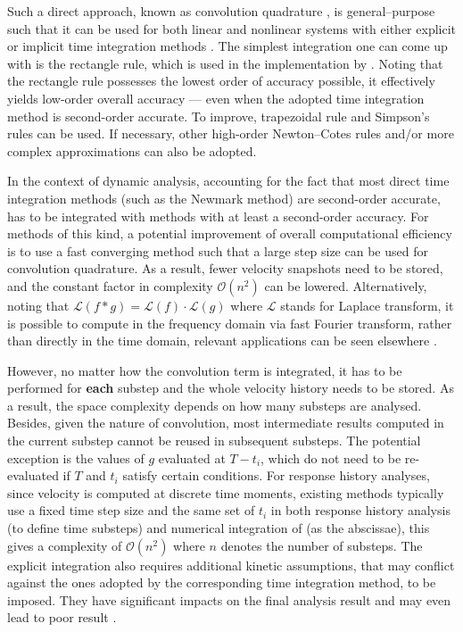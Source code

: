 Such a direct approach, known as convolution quadrature \citep[see][and the references therein]{Lubich2004}, is general--purpose such that it can be used for both linear and nonlinear systems with either explicit or implicit time integration methods \citep[see, e.g.,][]{Katsikadelis2019}. The simplest integration one can come up with is the rectangle rule, which is used in the implementation by \citet{Puthanpurayil2014}. Noting that the rectangle rule possesses the lowest order of accuracy possible, it effectively yields low-order overall accuracy --- even when the adopted time integration method is second-order accurate. To improve, trapezoidal rule \citep[e.g.,][]{Liu2014} and Simpson's rules \citep[e.g.,][]{Shen2019} can be used. If necessary, other high-order Newton--Cotes rules and/or more complex approximations \citep{Schaedle2006,Shen2021} can also be adopted.

In the context of dynamic analysis, accounting for the fact that most direct time integration methods (such as the Newmark method) are second-order accurate,  has to be integrated with methods with at least a second-order accuracy. For methods of this kind, a potential improvement of overall computational efficiency is to use a fast converging method \citep{Schaedle2006} such that a large step size can be used for convolution quadrature. As a result, fewer velocity snapshots need to be stored, and the constant factor in complexity $\mathcal{O}\left(n^2\right)$ can be lowered.
Alternatively, noting that $\mathcal{L}\left(f*g\right)=\mathcal{L}\left(f\right)\cdot\mathcal{L}\left(g\right)$ where $\mathcal{L}$ stands for Laplace transform, it is possible to compute  in the frequency domain via fast Fourier transform, rather than directly in the time domain, relevant applications can be seen elsewhere \citep{Pan2013,Zhao2019}.

However, no matter how the convolution term is integrated, it has to be performed for \textbf{each} substep and the whole velocity history needs to be stored. As a result, the space complexity depends on how many substeps are analysed. Besides, given the nature of convolution, most intermediate results computed in the current substep cannot be reused in subsequent substeps. The potential exception is the values of $g$ evaluated at $T-t_i$, which do not need to be re-evaluated if $T$ and $t_i$ satisfy certain conditions. For response history analyses, since velocity is computed at discrete time moments, existing methods typically use a fixed time step size and the same set of $t_i$ in both response history analysis (to define time substeps) and numerical integration of  (as the abscissae), this gives a complexity of $\mathcal{O}\left(n^2\right)$ where $n$ denotes the number of substeps. The explicit integration also requires additional kinetic assumptions, that may conflict against the ones adopted by the corresponding time integration method, to be imposed. They have significant impacts on the final analysis result \citep[see][]{Liu2014} and may even lead to poor result \cite[see][Figs. 12, 17, 25, 26]{Liu2023}.
